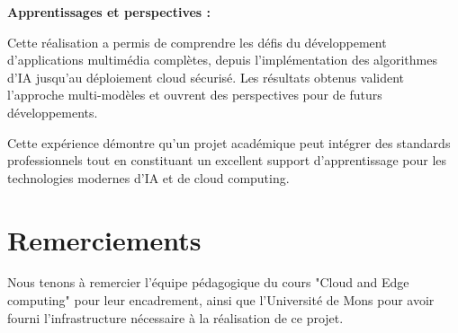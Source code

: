 \documentclass[12pt,a4paper]{article}
\begin{document}
\textbf{Apprentissages et perspectives :}

Cette réalisation a permis de comprendre les défis du développement d'applications multimédia complètes, depuis l'implémentation des algorithmes d'IA jusqu'au déploiement cloud sécurisé. Les résultats obtenus valident l'approche multi-modèles et ouvrent des perspectives pour de futurs développements.

Cette expérience démontre qu'un projet académique peut intégrer des standards professionnels tout en constituant un excellent support d'apprentissage pour les technologies modernes d'IA et de cloud computing.


\section*{Remerciements}

Nous tenons à remercier l'équipe pédagogique du cours "Cloud and Edge computing" pour leur encadrement, ainsi que l'Université de Mons pour avoir fourni l'infrastructure nécessaire à la réalisation de ce projet.
\end{document}

